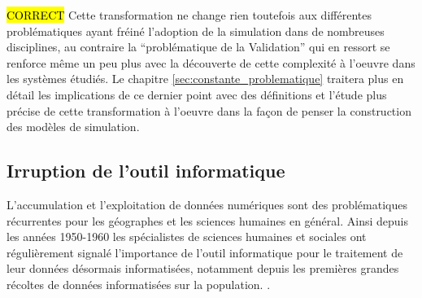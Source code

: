 \hl{CORRECT}
Cette transformation ne change rien toutefois aux différentes problématiques ayant fréiné l'adoption de la simulation dans de nombreuses disciplines, au contraire la \enquote{problématique de la Validation} qui en ressort se renforce même un peu plus avec la découverte de cette complexité à l'oeuvre dans les systèmes étudiés. Le chapitre \ref{sec:constante_problematique} traitera plus en détail les implications de ce dernier point avec des définitions et l'étude plus précise de cette transformation à l'oeuvre dans la façon de penser la construction des modèles de simulation.





\subsection{Irruption de l'outil informatique }
\label{sec:apparition_outil_informatique}


L'accumulation et l'exploitation de données numériques sont des problématiques récurrentes pour les géographes et les sciences humaines en général. Ainsi depuis les années 1950-1960 les spécialistes de sciences humaines et sociales ont régulièrement signalé l'importance de l'outil informatique pour le traitement de leur données désormais informatisées, notamment depuis les premières grandes récoltes de données informatisées sur la population. \autocites{Kao1963, Hagerstrand1967b}[386]{Barnes2011}. 

